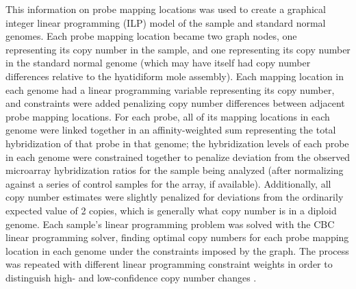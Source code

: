 \documentclass[11pt,proposal]{ucthesis}
\begin{document}
This information on probe mapping locations was used to create a graphical integer linear programming (ILP) model of the sample and standard normal genomes. Each probe mapping location became two graph nodes, one representing its copy number in the sample, and one representing its copy number in the standard normal genome (which may have itself had copy number differences relative to the hyatidiform mole assembly). Each mapping location in each genome had a linear programming variable representing its copy number, and constraints were added penalizing copy number differences between adjacent probe mapping locations. For each probe, all of its mapping locations in each genome were linked together in an affinity-weighted sum representing the total hybridization of that probe in that genome; the hybridization levels of each probe in each genome were constrained together to penalize deviation from the observed microarray hybridization ratios for the sample being analyzed (after normalizing against a series of control samples for the array, if available). Additionally, all copy number estimates were slightly penalized for deviations from the ordinarily expected value of 2 copies, which is generally what copy number is in a diploid genome. Each sample's linear programming problem was solved with the CBC linear programming solver, finding optimal copy numbers for each probe mapping location in each genome under the constraints imposed by the graph. The process was repeated with different linear programming constraint weights in order to distinguish high- and low-confidence copy number changes \cite{forrest2013cbc}.
\end{document}

